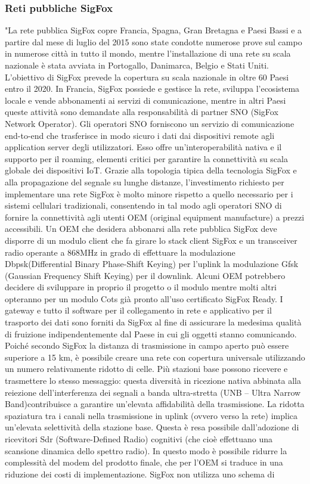 \documentclass[a4paper]{report} %
\begin{document}
\subsubsection{Reti pubbliche SigFox}
"La rete pubblica SigFox copre Francia, Spagna, Gran Bretagna e Paesi Bassi e a partire dal mese di luglio del 2015 sono state condotte numerose prove sul campo in numerose città in tutto il mondo, mentre l'installazione di una rete su scala nazionale è stata avviata in Portogallo, Danimarca, Belgio e Stati Uniti. L'obiettivo di SigFox prevede la copertura su scala nazionale in oltre 60 Paesi entro il 2020. In Francia, SigFox possiede e gestisce la rete, sviluppa l'ecosistema locale e vende abbonamenti ai servizi di comunicazione, mentre in altri Paesi queste attività sono demandate alla responsabilità di partner SNO (SigFox Network Operator). Gli operatori SNO forniscono un servizio di comunicazione end-to-end che trasferisce in modo sicuro i dati dai dispositivi remote agli application server degli utilizzatori. Esso offre un'interoperabilità nativa e il supporto per il roaming, elementi critici per garantire la connettività su scala globale dei dispositivi IoT. Grazie alla topologia tipica della tecnologia SigFox e alla propagazione del segnale su lunghe distanze, l'investimento richiesto per implementare una rete SigFox è molto minore rispetto a quello necessario per i sistemi cellulari tradizionali, consentendo in tal modo agli operatori SNO di fornire la connettività agli utenti OEM (original equipment manufacture) a prezzi accessibili. Un OEM che desidera abbonarsi alla rete pubblica SigFox deve disporre di un modulo client che fa girare lo stack client SigFox e un transceiver radio operante a 868MHz in grado di effettuare la modulazione Dbpsk(Differential Binary Phase-Shift Keying) per l'uplink la modulazione Gfsk (Gaussian Frequency Shift Keying) per il downlink. Alcuni OEM potrebbero decidere di sviluppare in proprio il progetto o il modulo mentre molti altri opteranno per un modulo Cots già pronto all'uso certificato SigFox Ready. I gateway e tutto il software per il collegamento in rete e applicativo per il trasporto dei dati sono forniti da SigFox al fine di assicurare la medesima qualità di fruizione indipendentemente dal Paese in cui gli oggetti stanno comunicando. Poiché secondo SigFox la distanza di trasmissione in campo aperto può essere superiore a 15 km, è possibile creare una rete con copertura universale utilizzando un numero relativamente ridotto di celle. Più stazioni base possono ricevere e trasmettere lo stesso messaggio: questa diversità in ricezione nativa abbinata alla reiezione dell'interferenza dei segnali a banda ultra-stretta (UNB – Ultra Narrow Band)contribuisce a garantire un'elevata affidabilità della trasmissione. La ridotta spaziatura tra i canali nella trasmissione in uplink (ovvero verso la rete) implica un'elevata selettività della stazione base. Questa è resa possibile dall'adozione di ricevitori Sdr (Software-Defined Radio) cognitivi (che cioè effettuano una scansione dinamica dello spettro radio). In questo modo è possibile ridurre la complessità del modem del prodotto finale, che per l'OEM si traduce in una riduzione dei costi di implementazione. SigFox non utilizza uno schema di 
\end{document}
